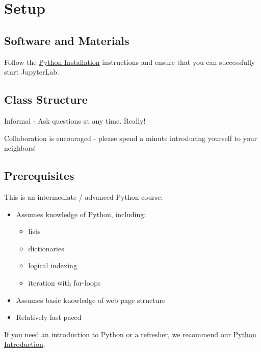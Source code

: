 \documentclass[
]{book}
\providecommand{\tightlist}{%
  \setlength{\itemsep}{0pt}\setlength{\parskip}{0pt}}
\begin{document}
\hypertarget{setup-5}{%
\section{Setup}\label{setup-5}}

\hypertarget{software-and-materials-5}{%
\subsection{Software and Materials}\label{software-and-materials-5}}

Follow the \href{./PythonInstall.html}{Python Installation} instructions and ensure that you can successfully start JupyterLab.

\hypertarget{class-structure-5}{%
\subsection{Class Structure}\label{class-structure-5}}

Informal - Ask questions at any time. Really!

Collaboration is encouraged - please spend a minute introducing yourself to your neighbors!

\hypertarget{prerequisites-5}{%
\subsection{Prerequisites}\label{prerequisites-5}}

This is an intermediate / advanced Python course:

\begin{itemize}
\tightlist
\item
  Assumes knowledge of Python, including:

  \begin{itemize}
  \tightlist
  \item
    lists
  \item
    dictionaries
  \item
    logical indexing
  \item
    iteration with for-loops
  \end{itemize}
\item
  Assumes basic knowledge of web page structure
\item
  Relatively fast-paced
\end{itemize}

If you need an introduction to Python or a refresher, we recommend our \href{https://iqss.github.io/dss-workshops/PythonIntro.html}{Python Introduction}.
\end{document}
